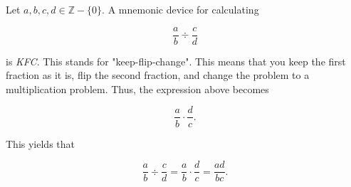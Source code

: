\documentclass[12pt]{article}
\begin{document}
Let $a,b,c,d \in \mathbb{Z}-\{0\}$.  A mnemonic device for calculating

$$\frac{a}{b} \div \frac{c}{d}$$

is {\sl KFC}.  This stands for "keep-flip-change".  This means that you keep the first fraction as it is, flip the second fraction, and change the problem to a multiplication problem.  Thus, the expression above becomes

$$\frac{a}{b} \cdot \frac{d}{c}.$$

This yields that

$$\frac{a}{b} \div \frac{c}{d}=\frac{a}{b} \cdot \frac{d}{c}=\frac{ad}{bc}.$$
\end{document}
